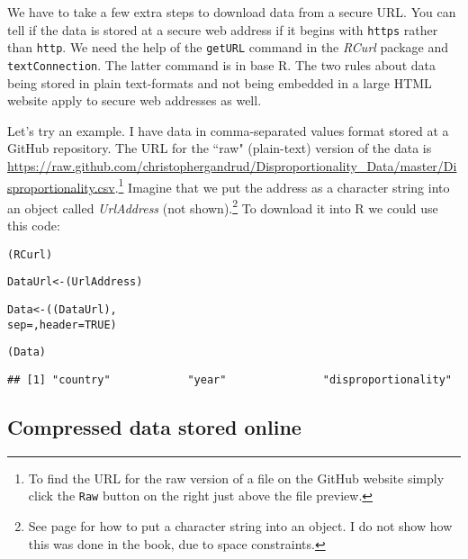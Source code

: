 \noindent We have to take a few extra steps to download data from a secure URL. You can tell if the data is stored at a secure web address if it begins with \texttt{https} rather than \texttt{http}. We need the help of the \texttt{getURL} command in the {\emph{RCurl}} package \cite[]{R-RCurl} and \texttt{textConnection}. The latter command is in base R. The two rules about data being stored in plain text-formats and not being embedded in a large HTML website apply to secure web addresses as well.

Let's try an example. I have data in comma-separated values format stored at a GitHub repository. The URL for the ``raw" (plain-text) version of the data is \url{https://raw.github.com/christophergandrud/Disproportionality_Data/master/Disproportionality.csv}.\footnote{To find the URL for the raw version of a file on the GitHub website simply click the \texttt{Raw} button on the right just above the file preview.} Imagine that we put the address as a character string into an object called \emph{UrlAddress} (not shown).\footnote{See page \pageref{Objects} for how to put a character string into an object. I do not show how this was done in the book, due to space constraints.}
To download it into R we could use this code:




{\small
\begin{knitrout}
\color{fgcolor}\begin{kframe}
\begin{alltt}
(RCurl)

DataUrl <- (UrlAddress)

Data <- ((DataUrl), 
					sep = , header = TRUE)
					
(Data)
\end{alltt}
\begin{verbatim}
## [1] "country"            "year"               "disproportionality"
\end{verbatim}
\end{kframe}
\end{knitrout}

}

\subsection{Compressed data stored online}

